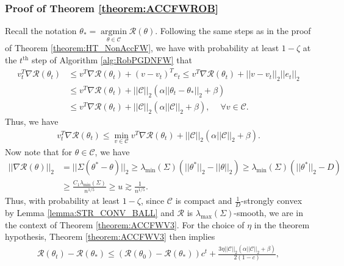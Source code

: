 \documentclass{article}
\begin{document}

\subsubsection{Proof of Theorem \ref{theorem:ACCFWROB}}\label{sec:ThmACCFWl>0}

Recall the notation $\theta_* = \mathop{\arg\min}\limits_{\theta \in \mathcal{C}}\mathcal{R}(\theta)$. Following the same steps as in the proof of Theorem \ref{theorem:HT_NonAccFW}, we have with probability at least $1-\zeta$ at the $t^{\text{th}}$ step of Algorithm \ref{alg:RobPGDNFW} that
\begin{align*}
v_t^T\nabla\mathcal{R}(\theta_t) &\leq v^T\nabla\mathcal{R}(\theta_t) + (v - v_t)^Te_t \leq v^T\nabla\mathcal{R}(\theta_t) + ||v - v_t||_2||e_t||_2\\
&\leq v^T\nabla\mathcal{R}(\theta_t) + ||\mathcal{C}||_2(\alpha ||\theta_t - \theta_*||_2 + \beta)\\
&\leq v^T\nabla\mathcal{R}(\theta_t) + ||\mathcal{C}||_2(\alpha ||\mathcal{C}||_2 + \beta), \ \quad \forall v \in \mathcal{C}.
\end{align*}
Thus, we have
\begin{align*}
v_t^T\nabla\mathcal{R}(\theta_t) \leq \mathop{\min}\limits_{v \in \mathcal{C}}v^T\nabla\mathcal{R}(\theta_t) + ||\mathcal{C}||_2(\alpha ||\mathcal{C}||_2 + \beta).
\end{align*}
Now note that for $\theta \in \mathcal{C}$, we have
\begin{align*}
||\nabla\mathcal{R}(\theta)||_2 &= ||\Sigma(\theta^* - \theta)||_2 \geq \lambda_{\min}(\Sigma)\left(||\theta^*||_2 - ||\theta||_2\right) \geq \lambda_{\min}(\Sigma)\left(||\theta^*||_2 - D\right)\\ 
&\geq \frac{C_1\lambda_{\min}(\Sigma)}{n^{1/5}} \geq u \gtrsim \frac{1}{n^{1/5}}.
\end{align*}
Thus, with probability at least $1 - \zeta$, since $\mathcal{C}$ is compact and $\frac{1}{D}$-strongly convex by Lemma \ref{lemma:STR_CONV_BALL} and $\mathcal{R}$ is $\lambda_{\max}(\Sigma)$-smooth, we are in the context of Theorem \ref{theorem:ACCFWV3}. For the choice of $\eta$ in the theorem hypothesis, Theorem \ref{theorem:ACCFWV3} then implies 
\begin{align*}
\mathcal{R}(\theta_t) - \mathcal{R}(\theta_*) \leq \left(\mathcal{R}(\theta_0) - \mathcal{R}(\theta_*)\right)c^t + \frac{3\eta ||\mathcal{C}||_2(\alpha ||\mathcal{C}||_2 + \beta)}{2(1 - c)},
\end{align*}
\end{document}
